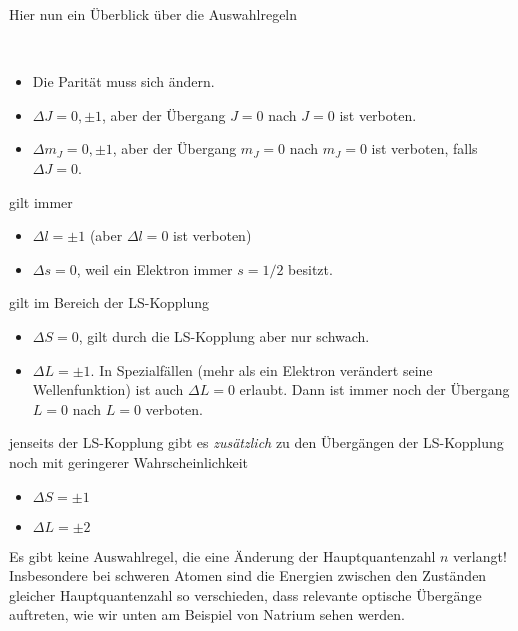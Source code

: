 Hier nun ein Überblick über die Auswahlregeln
\begin{description}\setlength{\itemsep}{0pt}
    \item[Es gilt immer] \ \\
\begin{itemize}\setlength{\itemsep}{0pt}
    \item Die Parität muss sich ändern.
    \item $\Delta J = 0, \pm 1$, aber der Übergang $J=0$ nach $J=0$ ist verboten.
    \item $\Delta m_J = 0, \pm 1$, aber der Übergang $m_J=0$ nach $m_J=0$ ist verboten, falls $\Delta J = 0$.
\end{itemize}

\item[Für Einelektron-Atome]  gilt immer  \ \\
\begin{itemize}\setlength{\itemsep}{0pt}
    \item  $\Delta l = \pm 1$ (aber  $\Delta l = 0$ ist verboten)
    \item $\Delta s = 0$, weil ein Elektron immer $s=1/2$ besitzt.
\end{itemize}

\item[Für Mehrelektron-Atome] gilt im Bereich der LS-Kopplung   \ \\  
\begin{itemize}\setlength{\itemsep}{0pt}
    \item $\Delta S = 0$, gilt durch die LS-Kopplung aber nur schwach.
    \item $\Delta L = \pm 1$. In Spezialfällen (mehr als ein Elektron verändert seine Wellenfunktion) ist auch $\Delta L = 0$ erlaubt. Dann ist immer noch der Übergang $L=0$ nach $L=0$  verboten.
\end{itemize}

\item[Für schwerere Mehrelektron-Atome]  jenseits  der LS-Kopplung gibt es \emph{zusätzlich} zu den Übergängen der LS-Kopplung noch mit geringerer Wahrscheinlichkeit    
\begin{itemize}\setlength{\itemsep}{0pt}
    \item $\Delta S  = \pm 1$
    \item $\Delta L =  \pm 2$ 
\end{itemize}
\end{description}

Es gibt keine Auswahlregel, die eine Änderung der Hauptquantenzahl $n$ verlangt! Insbesondere bei schweren Atomen sind die Energien zwischen den Zuständen gleicher Hauptquantenzahl so verschieden, dass relevante optische Übergänge auftreten, wie wir unten am Beispiel von Natrium sehen werden.

